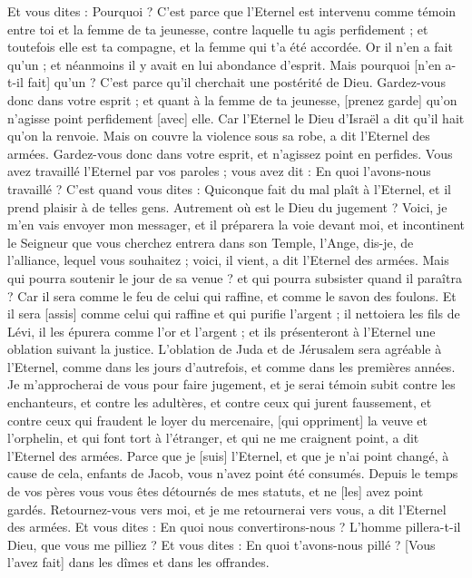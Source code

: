 \begin{multicols}{2}
Et vous dites : Pourquoi ? C'est parce que l'Eternel est intervenu comme témoin entre toi et la femme de ta jeunesse, contre laquelle tu agis perfidement ; et toutefois elle est ta compagne, et la femme qui t'a été accordée.
Or il n'en a fait qu'un ; et néanmoins il y avait en lui abondance d'esprit. Mais pourquoi [n'en a-t-il fait] qu'un ? C'est parce qu'il cherchait une postérité de Dieu. Gardez-vous donc dans votre esprit ; et quant à la femme de ta jeunesse, [prenez garde] qu'on n'agisse point perfidement [avec] elle.
Car l'Eternel le Dieu d'Israël a dit qu'il hait qu'on la renvoie. Mais on couvre la violence sous sa robe, a dit l'Eternel des armées. Gardez-vous donc dans votre esprit, et n'agissez point en perfides.
Vous avez travaillé l'Eternel par vos paroles ; vous avez dit : En quoi l'avons-nous travaillé ? C'est quand vous dites : Quiconque fait du mal plaît à l'Eternel, et il prend plaisir à de telles gens. Autrement où est le Dieu du jugement ?
\VerseOne{}Voici, je m'en vais envoyer mon messager, et il préparera la voie devant moi, et incontinent le Seigneur que vous cherchez entrera dans son Temple, l'Ange, dis-je, de l'alliance, lequel vous souhaitez ; voici, il vient, a dit l'Eternel des armées.
Mais qui pourra soutenir le jour de sa venue ? et qui pourra subsister quand il paraîtra ? Car il sera comme le feu de celui qui raffine, et comme le savon des foulons.
Et il sera [assis] comme celui qui raffine et qui purifie l'argent ; il nettoiera les fils de Lévi, il les épurera comme l'or et l'argent ; et ils présenteront à l'Eternel une oblation suivant la justice.
L'oblation de Juda et de Jérusalem sera agréable à l'Eternel, comme dans les jours d'autrefois, et comme dans les premières années.
Je m'approcherai de vous pour faire jugement, et je serai témoin subit contre les enchanteurs, et contre les adultères, et contre ceux qui jurent faussement, et contre ceux qui fraudent le loyer du mercenaire, [qui oppriment] la veuve et l'orphelin, et qui font tort à l'étranger, et qui ne me craignent point, a dit l'Eternel des armées.
Parce que je [suis] l'Eternel, et que je n'ai point changé, à cause de cela, enfants de Jacob, vous n'avez point été consumés.
Depuis le temps de vos pères vous vous êtes détournés de mes statuts, et ne [les] avez point gardés. Retournez-vous vers moi, et je me retournerai vers vous, a dit l'Eternel des armées. Et vous dites : En quoi nous convertirons-nous ?
L'homme pillera-t-il Dieu, que vous me pilliez ? Et vous dites : En quoi t'avons-nous pillé ? [Vous l'avez fait] dans les dîmes et dans les offrandes.

\end{multicols}
